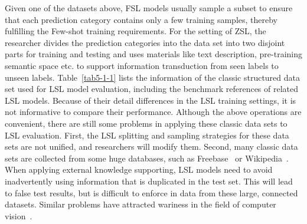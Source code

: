   Given one of the datasets above, FSL models usually sample a subset to ensure that each prediction category contains only a few training samples, thereby fulfilling the Few-shot training requirements. For the setting of ZSL, the researcher divides the prediction categories into the data set into two disjoint parts for training and testing and uses materials like text description, pre-training semantic space etc. to support information transduction from seen labels to unseen labels. Table~\ref{tab5-1-1} lists the information of the classic structured data set used for LSL model evaluation, including the benchmark references of related LSL models. Because of their detail differences in the LSL training settings, it is not informative to compare their performance.
Although the above operations are convenient, there are still some problems in applying these classic data sets to LSL evaluation. First, the LSL splitting and sampling strategies for these data sets are not unified, and researchers will modify them.  Second, many classic data sets are collected from some huge databases, such as Freebase~ or Wikipedia~. When applying external knowledge supporting, LSL models need to avoid inadvertently using information that is duplicated in the test set. This will lead to false test results, but is difficult to enforce in data from these large, connected datasets. Similar problems have attracted wariness in the field of computer vision~.

